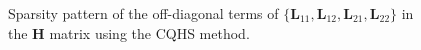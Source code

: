\begin{figure}[ht]

\centering

\begin{minipage}{0.33\textwidth}

\end{minipage}

\caption{Sparsity pattern of the off-diagonal terms of $\{ \bm{L}_{11}, \bm{L}_{12}, \bm{L}_{21}, \bm{L}_{22} \}$ in the $\mathbf{H}$ matrix using the CQHS method.}\label{fig:figsparsityCQHS}
\end{figure}